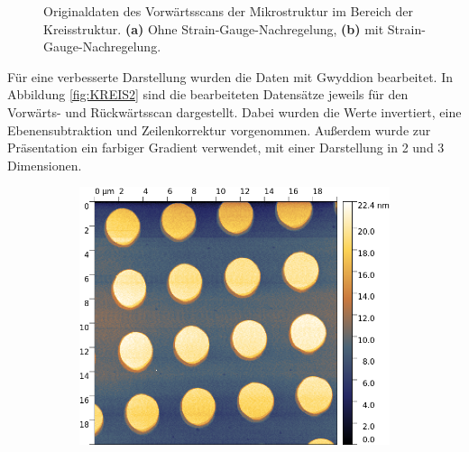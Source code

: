 \begin{figure}[H]
\begin{subfigure}{0.49\textwidth}
        \caption{}
        \label{fig:A2}
    \end{subfigure}
    \caption{Originaldaten des Vorwärtsscans der Mikrostruktur im Bereich der Kreisstruktur. \textbf{(a)} Ohne Strain-Gauge-Nachregelung, \textbf{(b)} mit Strain-Gauge-Nachregelung.}
    \label{fig:KREIS1}
\end{figure}


Für eine verbesserte Darstellung wurden die Daten mit Gwyddion \cite{Gwyddion} bearbeitet. In Abbildung \ref{fig:KREIS2} sind 
die bearbeiteten Datensätze jeweils für den Vorwärts- und Rückwärtsscan dargestellt. Dabei wurden die Werte invertiert, eine Ebenensubtraktion und 
Zeilenkorrektur vorgenommen. Außerdem wurde zur Präsentation ein farbiger Gradient verwendet, mit einer Darstellung in 2 und 3 Dimensionen.

\begin{figure}[H]
    \centering
    \begin{subfigure}{0.49\textwidth}
        \includegraphics[width=\textwidth]{bilder/Mikrostruktur/Kreis_Vor_2D.png}
        \caption{}
    \end{subfigure}
    \begin{subfigure}{0.49\textwidth}

\end{subfigure}
\end{figure}
